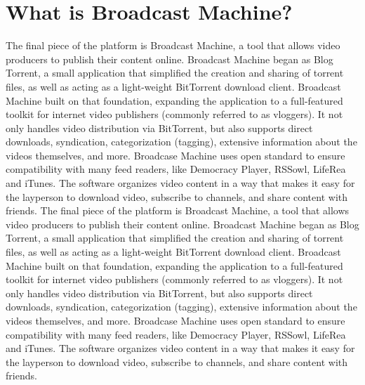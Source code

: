 \documentclass[a4paper,12pt]{report}
\begin{document}
\section{What is Broadcast Machine?}
    The final piece of the platform is Broadcast Machine, a tool that allows video producers to publish their content online.
    Broadcast Machine began as Blog Torrent, a small application that simplified the creation and sharing of torrent files, as well as acting as a light-weight BitTorrent download client.
Broadcast Machine built on that foundation, expanding the application to a full-featured toolkit for internet video publishers (commonly referred to as vloggers).
It not only handles video distribution via BitTorrent, but also supports direct downloads, syndication, categorization (tagging), extensive information about the videos themselves, and more.
Broadcase Machine uses open standard to ensure compatibility with many feed readers, like Democracy Player, RSSowl, LifeRea and iTunes.
The software organizes video content in a way that makes it easy for the layperson to download video, subscribe to channels, and share content with friends.
	The final piece of the platform is Broadcast Machine, a tool that allows video producers to publish their content online. 
	Broadcast Machine began as Blog Torrent, a small application that simplified the creation and sharing of torrent files, as well as acting as a light-weight BitTorrent download client. 
Broadcast Machine built on that foundation, expanding the application to a full-featured toolkit for internet video publishers (commonly referred to as vloggers). 
It not only handles video distribution via BitTorrent, but also supports direct downloads, syndication, categorization (tagging), extensive information about the videos themselves, and more. 
Broadcase Machine uses open standard to ensure compatibility with many feed readers, like Democracy Player, RSSowl, LifeRea and iTunes. 
The software organizes video content in a way that makes it easy for the layperson to download video, subscribe to channels, and share content with friends. 
\end{document}
